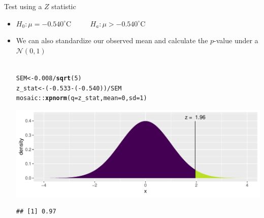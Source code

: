 \documentclass[10pt,handout]{beamer}\usepackage[]{graphicx}\usepackage[]{color}
\makeatletter
\def\maxwidth{ %
  \ifdim\Gin@nat@width>\linewidth
    \linewidth
  \else
    \Gin@nat@width
  \fi
}
\newcommand{\hlnum}[1]{\textcolor[rgb]{0.686,0.059,0.569}{#1}}%
\newcommand{\hlopt}[1]{\textcolor[rgb]{0,0,0}{#1}}%
\newcommand{\hlstd}[1]{\textcolor[rgb]{0.345,0.345,0.345}{#1}}%
\newcommand{\hlkwb}[1]{\textcolor[rgb]{0.69,0.353,0.396}{#1}}%
\newcommand{\hlkwc}[1]{\textcolor[rgb]{0.333,0.667,0.333}{#1}}%
\newcommand{\hlkwd}[1]{\textcolor[rgb]{0.737,0.353,0.396}{\textbf{#1}}}%
\newenvironment{kframe}{%
 \def\at@end@of@kframe{}%
 \ifinner\ifhmode%
  \def\at@end@of@kframe{\end{minipage}}%
  \begin{minipage}{\columnwidth}%
 \fi\fi%
 \def\FrameCommand##1{\hskip\@totalleftmargin \hskip-\fboxsep
 \colorbox{shadecolor}{##1}\hskip-\fboxsep
     \hskip-\linewidth \hskip-\@totalleftmargin \hskip\columnwidth}%
 \MakeFramed {\advance\hsize-\width
   \@totalleftmargin\z@ \linewidth\hsize
   \@setminipage}}%
 {\par\unskip\endMakeFramed%
 \at@end@of@kframe}
\newenvironment{knitrout}{}{} %
\makeatother
\begin{document}
\begin{frame}[fragile]{Test using a $Z$ statistic}
	\begin{itemize}
		\setlength\itemsep{.7em}
		\item   $H_0: \mu =  -0.540^{\circ}$C $\qquad$  $H_a: \mu >  -0.540^{\circ}$C
		
		\item We can also standardize our observed mean and calculate the $p$-value under a $\mathcal{N}(0,1)$ \\ \ \\
		
\begin{knitrout}\tiny
{}\color{fgcolor}\begin{kframe}
\begin{alltt}
\hlstd{SEM} \hlkwb{<-} \hlnum{0.008}\hlopt{/}\hlkwd{sqrt}\hlstd{(}\hlnum{5}\hlstd{)}
\hlstd{z_stat} \hlkwb{<-} \hlstd{(}\hlopt{-}\hlnum{0.533} \hlopt{-} \hlstd{(}\hlopt{-}\hlnum{0.540}\hlstd{))} \hlopt{/} \hlstd{SEM}
\hlstd{mosaic}\hlopt{::}\hlkwd{xpnorm}\hlstd{(}\hlkwc{q} \hlstd{= z_stat,} \hlkwc{mean} \hlstd{=} \hlnum{0}\hlstd{,} \hlkwc{sd} \hlstd{=} \hlnum{1}\hlstd{)}
\end{alltt}


{\ttfamily\noindent\itshape\color{messagecolor}{\#\# }}

{\ttfamily\noindent\itshape{}}

{\ttfamily\noindent\itshape\color{messagecolor}{\#\# 	P(X <= 1.957) = P(Z <= 1.957) = 0.9748}}

{\ttfamily\noindent\itshape\color{messagecolor}{\#\# 	P(X >\ \ 1.957) = P(Z >\ \ 1.957) = 0.0252}}

{\ttfamily\noindent\itshape\color{messagecolor}{\#\# }}\end{kframe}

{\centering \includegraphics[width=\maxwidth]{figure/unnamed-chunk-2-1} 

}


\begin{kframe}\begin{verbatim}
## [1] 0.97
\end{verbatim}
\end{kframe}
\end{knitrout}
		
	\end{itemize}
\end{frame}
\end{document}
